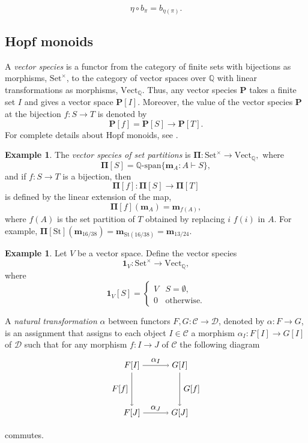 \documentclass[12pt]{amsart}  %
\theoremstyle{definition}
\newtheorem{example}[theorem]{Example}
\theoremstyle{remark}
\numberwithin{equation}{section}
\newcommand{\bbQ}{\mathbb{Q}}
\newcommand{\mhm}{\mathbf{m}}           	%
\newcommand{\calC}{{\mathcal{C}}}
\newcommand{\calD}{{\mathcal{D}}}
\newcommand{\Set}{{\mathrm{Set}}}
\newcommand{\Vect}{{\mathrm{Vect}}}
\newcommand{\bP}{{\mathbf{P}}}
\newcommand{\bPi}{{\mathbf{\Pi}}}
\newcommand{\bone}{{\mathbf{1}}}
\newcommand{\St}{{\mathrm{St}}}
\newcommand\FA[1]{{\color{red}{#1}}}
\newcommand\svw[1]{{\color{black}{#1}}}
\begin{document}
\begin{equation}\label{eq:actbasis}
\eta\circ b_\pi=b_{\eta(\pi)}.
\end{equation}

 
\subsection{Hopf monoids} 
A \emph{vector species} is a functor from the category of finite sets with bijections as morphisms, $\Set^\times$, to the category of vector spaces over $\mathbb{Q}$ with linear transformations as morphisms, $\Vect_\bbQ$. Thus, any vector species $\bP$ takes a finite set $I$ and gives a vector space $\bP[I]$. Moreover, the value of the vector species $\bP$ at the bijection $f:S\rightarrow T$ is denoted by $$\bP[f]=\bP[S]\rightarrow \bP[T].$$
For complete details about Hopf monoids, see \cite{AM}.

 
\begin{example} \label{ex:MonSet}
 The {\it vector species of set partitions} is  $\bPi: \Set^\times\rightarrow\Vect_\bbQ,$ where 
$$\bPi[S]=\bbQ\text{-span}\{\mhm_{A}: A \vdash S\},$$
and  {if $f: S\rightarrow T$ is a bijection, then 
$$\bPi[f]:\bPi[S]\rightarrow \bPi[T]$$ is defined by the linear extension of the map,
$$\bPi[f](\mhm_{A})=\mhm_{f(A)},$$ where $f(A)$ is the set partition of $T$ obtained by replacing $i$ \svw{with} $f(i)$ in $A$. }
 For example, $\bPi[\St](\mhm_{16/38})=\mhm_{\St(16/38)}=\mhm_{13/24}$.
 \end{example} 

%

\begin{example} 
Let $V$ be a vector space. Define the vector species $$\bone_V: \Set^\times \rightarrow \Vect_\bbQ,$$ where $$\bone_V[S]=\begin{cases} V &  S=\emptyset,\\ 0& \text{otherwise.} \end{cases} $$
\end{example}


{
A \emph{natural transformation} $\alpha$ between functors $F, G:\calC\rightarrow \calD$, denoted by $\alpha:F\rightarrow G$, is an assignment that assigns to each object $I\in \calC$ a morphism $\alpha_I:F[I]\rightarrow G[I]$ of $\calD$ such that for any morphism $f:I\rightarrow J$ of $\calC$ the following diagram 
$$
\begin{tikzpicture} 
\node(FC) at (0,0){$F[I]$};
\node(GC) at (2,0){$G[I]$};
\node(FD) at (0,-2){$F[J]$};
\node(GD) at (2,-2){$G[J]$};
\draw[->] (FC)--(GC);
\node at (1,0.2){$\alpha_I$};
\draw[->] (FD)--(GD);
\node at (1,-1.8){$\alpha_J$};
\draw[->] (FC)--(FD);
\node at (-0.5,-1){$F[f]$};
\draw[->] (GC)--(GD);
\node at (2.5,-1){$G[f]$};
\end{tikzpicture} 
 $$
commutes.
}
\end{document}
